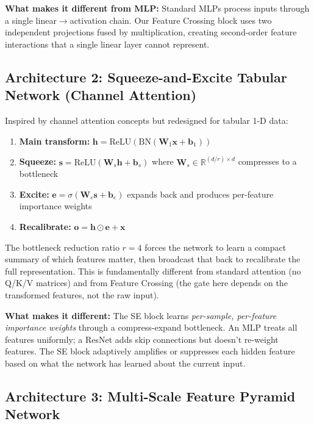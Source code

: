\documentclass[11pt,a4paper]{article}
\begin{document}
\textbf{What makes it different from MLP:} Standard MLPs process inputs through a single linear$\rightarrow$activation chain. Our Feature Crossing block uses two independent projections fused by multiplication, creating second-order feature interactions that a single linear layer cannot represent.

\subsection{Architecture 2: Squeeze-and-Excite Tabular Network (Channel Attention)}

Inspired by channel attention concepts but redesigned for tabular 1-D data:

\begin{enumerate}[leftmargin=1.2em,itemsep=0.1em]
    \item \textbf{Main transform:} $\mathbf{h} = \text{ReLU}(\text{BN}(\mathbf{W}_1 \mathbf{x} + \mathbf{b}_1))$
    \item \textbf{Squeeze:} $\mathbf{s} = \text{ReLU}(\mathbf{W}_s \mathbf{h} + \mathbf{b}_s)$ where $\mathbf{W}_s \in \mathbb{R}^{(d/r) \times d}$ compresses to a bottleneck
    \item \textbf{Excite:} $\mathbf{e} = \sigma(\mathbf{W}_e \mathbf{s} + \mathbf{b}_e)$ expands back and produces per-feature importance weights
    \item \textbf{Recalibrate:} $\mathbf{o} = \mathbf{h} \odot \mathbf{e} + \mathbf{x}$
\end{enumerate}

The bottleneck reduction ratio $r=4$ forces the network to learn a compact summary of which features matter, then broadcast that back to recalibrate the full representation. This is fundamentally different from standard attention (no Q/K/V matrices) and from Feature Crossing (the gate here depends on the transformed features, not the raw input).

\textbf{What makes it different:} The SE block learns \emph{per-sample, per-feature importance weights} through a compress-expand bottleneck. An MLP treats all features uniformly; a ResNet adds skip connections but doesn't re-weight features. The SE block adaptively amplifies or suppresses each hidden feature based on what the network has learned about the current input.

\subsection{Architecture 3: Multi-Scale Feature Pyramid Network}
\end{document}
